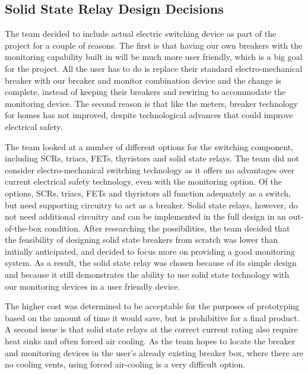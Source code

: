 \subsection{Solid State Relay Design Decisions}
The team decided to include actual electric switching device as part of the project for a couple of reasons. The first is that having our own breakers with the monitoring capability built in will be much more user friendly, which is a big goal for the project. All the user has to do is replace their standard electro-mechanical breaker with our breaker and monitor combination device and the change is complete, instead of keeping their breakers and rewiring to accommodate the monitoring device. The second reason is that like the meters, breaker technology for homes has not improved, despite technological advances that could improve electrical safety.

The team looked at a number of different options for the switching component, including SCRs, triacs, FETs, thyristors and solid state relays. The team did not consider electro-mechanical switching technology as it offers no advantages over current electrical safety technology, even with the monitoring option. Of the options, SCRs, triacs, FETs and thyristors all function adequately as a switch, but need supporting circuitry to act as a breaker. Solid state relays, however, do not need additional circuitry and can be implemented in the full design in an out-of-the-box condition. After researching the possibilities, the team decided that the feasibility of designing solid state breakers from scratch was lower than initially anticipated, and decided to focus more on providing a good monitoring system. As a result, the solid state relay was chosen because of its simple design and because it still demonstrates the ability to use solid state technology with our monitoring devices in a user friendly device.

The higher cost was determined to be acceptable for the purposes of prototyping based on the amount of time it would save, but is prohibitive for a final product. A second issue is that solid state relays at the correct current rating also require heat sinks and often forced air cooling. As the team hopes to locate the breaker and monitoring devices in the user's already existing breaker box, where there are no cooling vents, using forced air-cooling is a very difficult option. 
